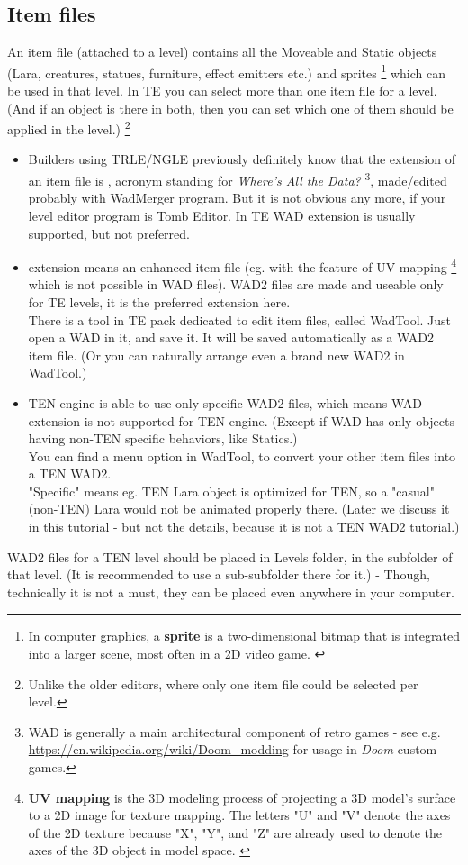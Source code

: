 \subsection{Item files}
An item file (attached to a level) contains all the Moveable and Static objects (Lara, creatures, statues, furniture, effect emitters etc.) and sprites \footnote{In computer graphics, a \textbf{sprite} is a two-dimensional bitmap that is integrated into a larger scene, most often in a 2D video game. \cite{sprite_wikipedia} } which can be used in that level.
In TE you can select more than one item file for a level. (And if an object is there in both, then you can set which one of them should be applied in the level.)
\footnote{Unlike the older editors, where only one item file could be selected per level.}
\begin {itemize}
    \item \par Builders using TRLE/NGLE previously definitely know that the extension of an item file is , acronym standing for \emph{Where's All the Data?} \footnote{WAD is generally a main architectural component of retro games - see e.g. \url{https://en.wikipedia.org/wiki/Doom_modding} for usage in \emph{Doom} custom games.}, made/edited probably with WadMerger program. But it is not obvious any more, if your level editor program is Tomb Editor. In TE WAD extension is usually supported, but not preferred.
    \item {} extension means an enhanced item file (eg. with the feature of UV-mapping \footnote{\textbf{UV mapping} is the 3D modeling process of projecting a 3D model's surface to a 2D image for texture mapping. The letters "U" and "V" denote the axes of the 2D texture because "X", "Y", and "Z" are already used to denote the axes of the 3D object in model space. \cite{UV_mapping_wikipedia} } which is not possible in WAD files). WAD2 files are made and useable only for TE levels, it is the preferred extension here. \\ There is a tool in TE pack dedicated to edit item files, called WadTool. Just open a WAD in it, and save it. It will be saved automatically as a WAD2 item file. (Or you can naturally arrange even a brand new WAD2 in WadTool.)
    \item TEN engine is able to use only specific WAD2 files, which means WAD extension is not supported for TEN engine. (Except if WAD has only objects having non-TEN specific behaviors, like Statics.) \\ You can find a menu option in WadTool, to convert your other item files into a TEN WAD2. \\ "Specific" means eg. TEN Lara object is optimized for TEN, so a "casual" (non-TEN) Lara would not be animated properly there. (Later we discuss it in this tutorial - but not the details, because it is not a TEN WAD2 tutorial.)
\end{itemize}
WAD2 files for a TEN level should be placed in Levels folder, in the subfolder of that level. (It is recommended to use a sub-subfolder there for it.) - Though, technically it is not a must, they can be placed even anywhere in your computer.
